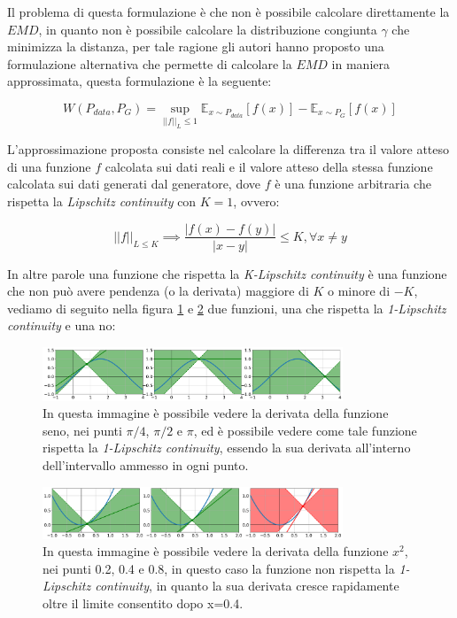 Il problema di questa formulazione è che non è possibile calcolare direttamente la $EMD$, in quanto non è possibile calcolare la distribuzione 
congiunta $\gamma$ che minimizza la distanza, per tale ragione gli autori hanno proposto una formulazione alternativa che permette di calcolare 
la $EMD$ in maniera approssimata, questa formulazione è la seguente:

\begin{equation}
    \label{eq:Wasserstein_approx}
    W(P_{data},P_{G}) = \sup_{||f||_{L} \leq 1}\mathbb{E}_{x\sim P_{data}}[f(x)] - \mathbb{E}_{x\sim P_{G}}[f(x)]
\end{equation}

L'approssimazione proposta consiste nel calcolare la differenza tra il valore atteso di una funzione $f$ calcolata sui dati reali e il valore atteso
della stessa funzione calcolata sui dati generati dal generatore, dove $f$ è una funzione arbitraria che rispetta la \textit{Lipschitz continuity} con $K=1$, ovvero:

\begin{equation}
    ||f||_{L \leq K} \implies \frac{|f(x)-f(y)|}{|x-y|} \leq K, \forall x \neq y
\end{equation}

In altre parole una funzione che rispetta la \textit{K-Lipschitz continuity} è una funzione che non può avere pendenza (o la derivata) maggiore di $K$ o minore di $-K$,
vediamo di seguito nella figura \ref{fig:lipschitz_continuity} e \ref{fig:lipschitz_continuity2} due funzioni, una che rispetta la \textit{1-Lipschitz continuity} e una no:

    \begin{figure}[H]
        \centering
        \includegraphics[width=0.8\textwidth]{imgs/graphs/sin_1lipschitz.png}
        \caption{In questa immagine è possibile vedere la derivata della funzione seno, nei punti $\pi/4$, $\pi/2$ e $\pi$,
        ed è possibile vedere come tale funzione rispetta la \textit{1-Lipschitz continuity}, essendo la sua derivata 
        all'interno dell'intervallo ammesso in ogni punto.}
        \label{fig:lipschitz_continuity}
    \end{figure}

    \begin{figure}[H]
        \centering
        \includegraphics[width=0.8\textwidth]{imgs/graphs/x2_1lipschitz.png}
        \caption{In questa immagine è possibile vedere la derivata della funzione $x^2$, nei punti 0.2, 0.4 e 0.8,
        in questo caso la funzione non rispetta la \textit{1-Lipschitz continuity}, in quanto la sua derivata cresce rapidamente 
        oltre il limite consentito dopo x=0.4.}
        \label{fig:lipschitz_continuity2}
    \end{figure}

